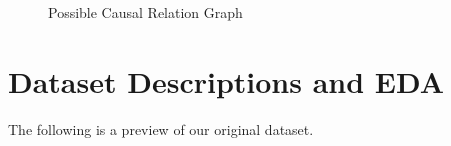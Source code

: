 \documentclass{article}
\begin{document}
\begin{minipage}[t]{0.3\linewidth}
\begin{figure}[H]
    \centering
    \caption{\label{fig:relation}Possible Causal Relation Graph}
\end{figure}
\end{minipage}

\section{Dataset Descriptions and EDA}
The following is a preview of our original dataset.
\end{document}

